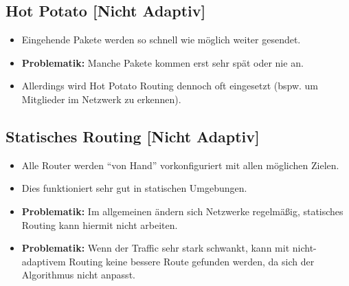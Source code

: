 \documentclass[a4paper, 11pt, accentcolor = tud3b]{tudreport}
\begin{document}
	        \subsection{Hot Potato [Nicht Adaptiv]}
		        \begin{itemize}
		        	\item Eingehende Pakete werden so schnell wie möglich weiter gesendet.
		        	\item \textbf{Problematik:} Manche Pakete kommen erst sehr spät oder nie an.
		        	\item Allerdings wird Hot Potato Routing dennoch oft eingesetzt (bspw. um Mitglieder im Netzwerk zu erkennen).
		        \end{itemize}
	        
	        \subsection{Statisches Routing [Nicht Adaptiv]}
		        \begin{itemize}
		        	\item Alle Router werden \enquote{von Hand} vorkonfiguriert mit allen möglichen Zielen.
		        	\item Dies funktioniert sehr gut in statischen Umgebungen.
		        	\item \textbf{Problematik:} Im allgemeinen ändern sich Netzwerke regelmäßig, statisches Routing kann hiermit nicht arbeiten.
		        	\item \textbf{Problematik:} Wenn der Traffic sehr stark schwankt, kann mit nicht-adaptivem Routing keine bessere Route gefunden werden, da sich der Algorithmus nicht anpasst.
		        \end{itemize}
            
\end{document}
